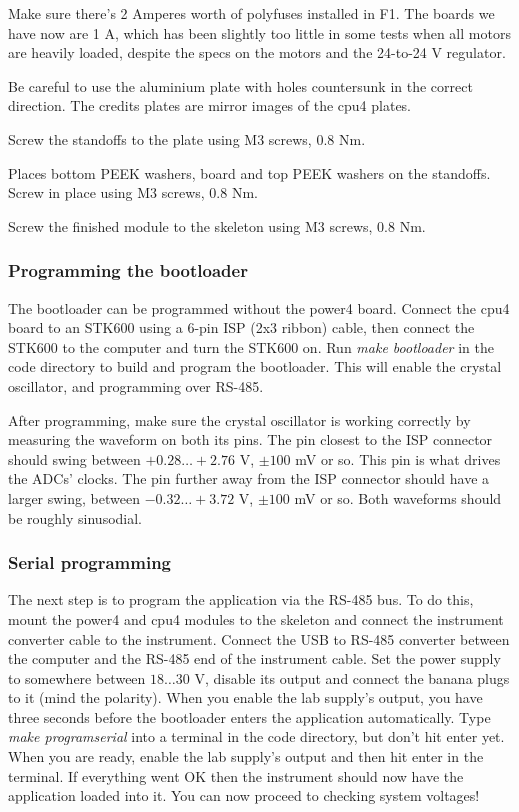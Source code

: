 \documentclass{article}
\begin{document}
Make sure there's 2 Amperes worth of polyfuses installed in F1.
The boards we have now are 1 A, which has been slightly too little in some tests when all motors are heavily loaded, despite the specs on the motors and the 24-to-24 V regulator.

Be careful to use the aluminium plate with holes countersunk in the correct direction.
The credits plates are mirror images of the cpu4 plates.

Screw the standoffs to the plate using M3 screws, 0.8 Nm.

Places bottom PEEK washers, board and top PEEK washers on the standoffs.
Screw in place using M3 screws, 0.8 Nm.

Screw the finished module to the skeleton using M3 screws, 0.8 Nm.

\subsubsection{Programming the bootloader}

The bootloader can be programmed without the power4 board.
Connect the cpu4 board to an STK600 using a 6-pin ISP (2x3 ribbon) cable,
then connect the STK600 to the computer and turn the STK600 on.
Run \emph{make bootloader} in the code directory to build and program the bootloader.
This will enable the crystal oscillator, and programming over RS-485.

After programming, make sure the crystal oscillator is working correctly by measuring the waveform on both its pins.
The pin closest to the ISP connector should swing between $+0.28 \dots +2.76$ V, $\pm 100$ mV or so.
This pin is what drives the ADCs' clocks.
The pin further away from the ISP connector should have a larger swing, between $-0.32 \dots +3.72$ V, $\pm 100$ mV or so.
Both waveforms should be roughly sinusodial.

\subsubsection{Serial programming}

The next step is to program the application via the RS-485 bus.
To do this, mount the power4 and cpu4 modules to the skeleton and connect the instrument converter cable to the instrument.
Connect the USB to RS-485 converter between the computer and the RS-485 end of the instrument cable.
Set the power supply to somewhere between $18 \dots 30$ V,
disable its output and connect the banana plugs to it (mind the polarity).
When you enable the lab supply's output, you have three seconds before the bootloader enters the application automatically.
Type \emph{make programserial} into a terminal in the code directory, but don't hit enter yet.
When you are ready, enable the lab supply's output and then hit enter in the terminal.
If everything went OK then the instrument should now have the application loaded into it.
You can now proceed to checking system voltages!
\end{document}
